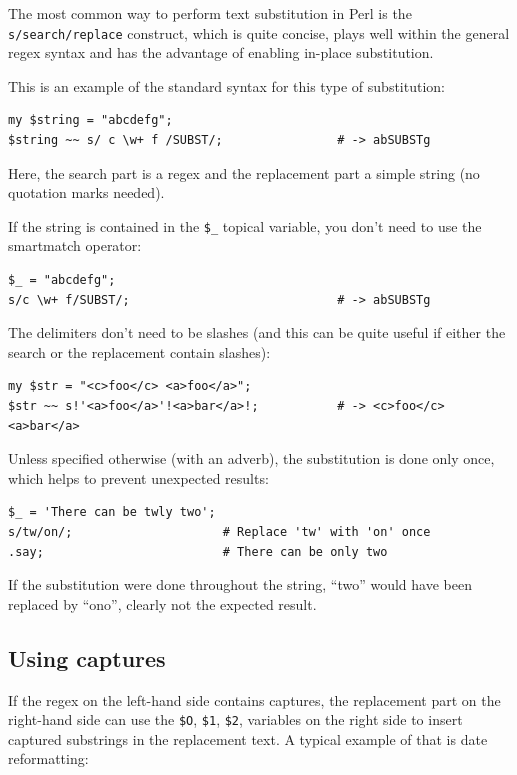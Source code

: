 The most common way to perform text substitution 
in Perl is the \verb's/search/replace' construct, which 
is quite concise, plays well within the general regex syntax
and has the advantage of enabling in-place substitution.

This is an example of the standard syntax for this type 
of substitution:

\begin{verbatim}
my $string = "abcdefg";
$string ~~ s/ c \w+ f /SUBST/;                # -> abSUBSTg
\end{verbatim}

Here, the search part is a regex and the replacement 
part a simple string (no quotation marks needed).

If the string is contained in the \verb'$_' topical variable,
you don't  need to use the smartmatch operator:

\begin{verbatim}
$_ = "abcdefg";
s/c \w+ f/SUBST/;                             # -> abSUBSTg
\end{verbatim}
%

The delimiters don't need to be slashes (and this can be quite 
useful if either the search or the replacement contain slashes):

\begin{verbatim}
my $str = "<c>foo</c> <a>foo</a>";
$str ~~ s!'<a>foo</a>'!<a>bar</a>!;           # -> <c>foo</c> <a>bar</a>
\end{verbatim}
%

Unless specified otherwise (with an adverb), the substitution 
is done only once, which helps to prevent unexpected results:

\begin{verbatim}
$_ = 'There can be twly two';
s/tw/on/;                     # Replace 'tw' with 'on' once
.say;                         # There can be only two
\end{verbatim}
%
If the substitution were done throughout the string, ``two'' 
would have been replaced by ``ono'', clearly not the expected 
result.

\subsection{Using captures}

If the regex on the left-hand side contains captures, the 
replacement part on the right-hand side can use the \verb'$O', 
\verb'$1', \verb'$2', variables on the right side to insert 
captured substrings in the replacement text. A typical 
example of that is date reformatting:

